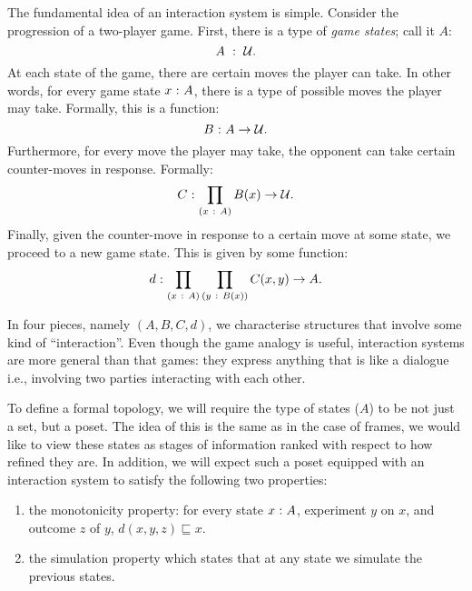 The fundamental idea of an interaction system is simple. Consider the progression of a
two-player game. First, there is a type of \emph{game states}; call it $A$:
\begin{equation*}
  A~:~\mathcal{U}.
\end{equation*}
At each state of the game, there are certain moves the player can take. In other words,
for every game state $x\hspace{0.1mm}:\hspace{0.1mm}A$, there is a type of possible moves the player may take.
Formally, this is a function:
\begin{equation*}
  B\hspace{0.1mm}:\hspace{0.1mm}A \rightarrow \mathcal{U}.
\end{equation*}
Furthermore, for every move the player may take, the opponent can take certain
counter-moves in response. Formally:
\begin{equation*}
  C\hspace{0.1mm}:\hspace{0.1mm}\prod_{(x~:~A)} B(x) \rightarrow \mathcal{U}.
\end{equation*}
Finally, given the counter-move in response to a certain move at some state, we proceed to
a new game state. This is given by some function:
\begin{equation*}
  d\hspace{0.1mm}:\hspace{0.1mm}\prod_{(x~:~A)} \prod_{(y~:~B(x))} C(x, y) \rightarrow A.
\end{equation*}

In four pieces, namely $(A, B, C, d)$, we characterise structures that involve some kind
of ``interaction''. Even though the game analogy is useful, interaction systems are more
general than that games: they express anything that is like a dialogue i.e., involving
two parties interacting with each other.

To define a formal topology, we will require the type of states ($A$) to be not just a
set, but a poset. The idea of this is the same as in the case of frames, we would like to
view these states as stages of information ranked with respect to how refined they are.
In addition, we will expect such a poset equipped with an interaction system to satisfy
the following two properties:
\begin{enumerate}
\item the monotonicity property: for every state $x\hspace{0.1mm}:\hspace{0.1mm}A$, experiment
  $y$ on $x$, and outcome $z$ of $y$, $d(x, y, z) \sqsubseteq x$.
  \item the simulation property which states that at any state we simulate the previous
    states.
\end{enumerate}

